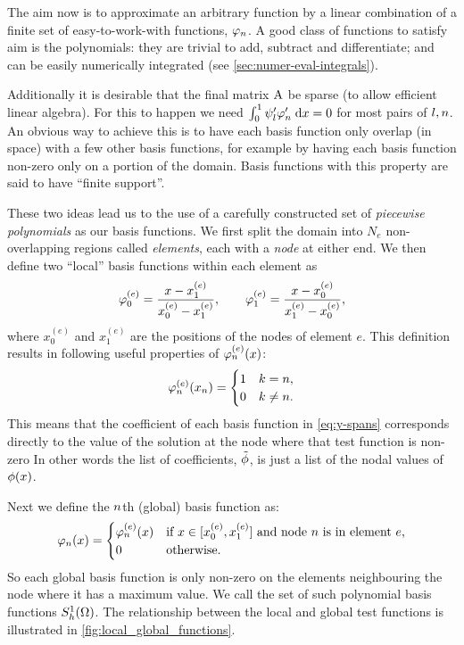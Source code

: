{The aim now is to approximate an arbitrary function by a linear combination of a finite set of easy-to-work-with functions, $\varphi_n$.
A good class of functions to satisfy aim is the polynomials: they are trivial to add, subtract and differentiate; and can be easily numerically integrated (see \cref{sec:numer-eval-integrals}).

Additionally it is desirable that the final matrix $\mathrm{A}$ be sparse (to allow efficient linear algebra).
For this to happen we need ${\int_0^1  \psi_{l}'\varphi'_{n}  {\; \mathrm{{d}}}{x}} = 0$ for most pairs of $l, n$.
An obvious way to achieve this is to have each basis function only overlap (in space) with a few other basis functions, for example by having each basis function non-zero only on a portion of the domain.
Basis functions with this property are said to have ``finite support''.

These two ideas lead us to the use of a carefully constructed set of \emph{piecewise polynomials} as our basis functions.
We first split the domain into $N_e$ non-overlapping regions called \emph{elements}, each with a \emph{node} at either end.
We then define two ``local'' basis functions within each element as
\begin{equation}
  \varphi^{(e)}_{0}=\dfrac{x-x^{(e)}_{1}}{x^{(e)}_{0}-x^{(e)}_{1}},\qquad
  \varphi^{(e)}_{1}=\dfrac{x-x^{(e)}_{0}}{x^{(e)}_{1}-x^{(e)}_{0}},
  \label{eq:simple_lagrange}
\end{equation}
where $x^{(e)}_0$ and $x^{(e)}_1$ are the positions of the nodes of element $e$.
This definition results in following useful properties of $\varphi^{(e)}_{n}(x)$:
\begin{equation}
  \label{eq:35}
  \varphi^{(e)}_{n}(x_{n}) =
  \begin{cases}
    1 & k = n, \\
    0 & k \neq n.
  \end{cases}
\end{equation}
This means that the coefficient of each basis function in \cref{eq:y-spans} corresponds directly to the value of the solution at the node where that test function is non-zero
In other words the list of coefficients, $\tilde{\phi}$, is just a list of the nodal values of $\phi(x)$.

Next we define the $n$th (global) basis function as:
\begin{equation}
  \label{eq:33}
  \varphi_n(x) =
  \begin{cases}
    \varphi_n^{(e)}(x) & \text{if $x \in [x^{(e)}_0, x^{(e)}_1]$ and node $n$ is in element $e$,} \\
    0 & \text{otherwise.}
  \end{cases}
\end{equation}
So each global basis function is only non-zero on the elements neighbouring the node where it has a maximum value.
We call the set of such polynomial basis functions ${S_h^1(\Omega)}$.
The relationship between the local and global test functions is illustrated in \cref{fig:local_global_functions}.

}
